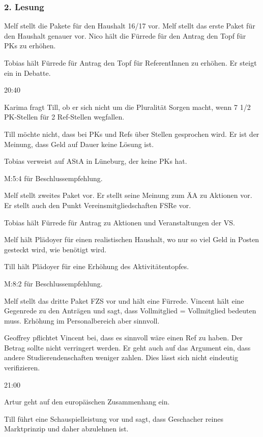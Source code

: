 \documentclass[ngerman,headheight=70pt]{scrartcl}
\begin{document}
    \subsubsection{2. Lesung}

    Melf stellt die Pakete für den Haushalt 16/17 vor. Melf stellt das erste
    Paket für den Haushalt genauer vor. Nico hält die Fürrede für den Antrag
    den Topf für PKs zu erhöhen.

    Tobias hält Fürrede für Antrag den Topf für ReferentInnen zu erhöhen. Er
    steigt ein in Debatte.

    20:40

    Karima fragt Till, ob er sich nicht um die Pluralität Sorgen macht, wenn
    7 1/2 PK-Stellen für 2 Ref-Stellen wegfallen.

    Till möchte nicht, dass bei PKs und Refs über Stellen gesprochen wird.
    Er ist der Meinung, dass Geld auf Dauer keine Lösung ist.

    Tobias verweist auf AStA in Lüneburg, der keine PKs hat.

    M:5:4 für Beschlussempfehlung.

    Melf stellt zweites Paket vor. Er stellt seine Meinung zum ÄA zu Aktionen
    vor. Er stellt auch den Punkt Vereinsmitgliedschaften FSRe vor.

    Tobias hält Fürrede für Antrag zu Aktionen und Veranstaltungen der VS.

    Melf hält Plädoyer für einen realistischen Haushalt, wo nur so viel
    Geld in Posten gesteckt wird, wie benötigt wird.

    Till hält Plädoyer für eine Erhöhung des Aktivitätentopfes.

    M:8:2 für Beschlussempfehlung.

    Melf stellt das dritte Paket FZS vor und hält eine Fürrede. Vincent hält
    eine Gegenrede zu den Anträgen und sagt, dass Vollmitglied = Vollmitglied
    bedeuten muss. Erhöhung im Personalbereich aber sinnvoll.

    Geoffrey pflichtet Vincent bei, dass es sinnvoll wäre einen Ref zu haben.
    Der Betrag sollte nicht verringert werden. Er geht auch auf das Argument ein,
    dass andere Studierendenschaften weniger zahlen. Dies lässt sich nicht
    eindeutig verifizieren.

    21:00

    Artur geht auf den europäischen Zusammenhang ein.

    Till führt eine Schauspielleistung vor und sagt, dass Geschacher reines
    Marktprinzip und daher abzulehnen ist.
\end{document}

